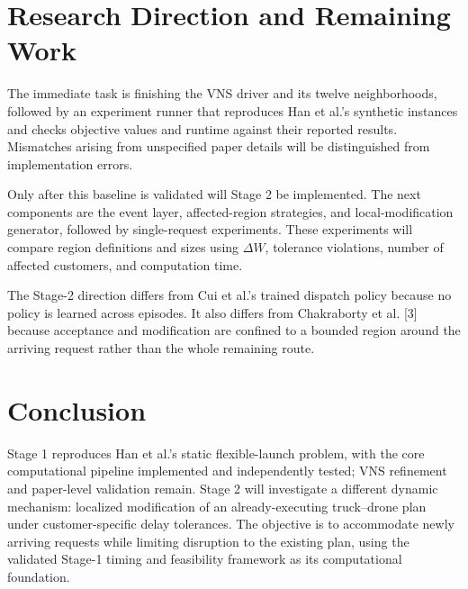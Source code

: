 \documentclass[10pt,a4paper]{article}
\begin{document}
\section{Research Direction and Remaining Work}

The immediate task is finishing the VNS driver and its twelve
neighborhoods, followed by an experiment runner that reproduces Han
et al.'s synthetic instances and checks objective values and runtime
against their reported results. Mismatches arising from unspecified
paper details will be distinguished from implementation errors.

Only after this baseline is validated will Stage 2 be implemented. The
next components are the event layer, affected-region strategies, and
local-modification generator, followed by single-request experiments.
These experiments will compare region definitions and sizes using
$\Delta W$, tolerance violations, number of affected customers, and
computation time.

The Stage-2 direction differs from Cui et al.'s trained dispatch policy
because no policy is learned across episodes. It also differs from
Chakraborty et al. [3] because acceptance and modification are confined
to a bounded region around the arriving request rather than the whole
remaining route.

\section{Conclusion}

Stage 1 reproduces Han et al.'s static flexible-launch problem, with
the core computational pipeline implemented and independently tested;
VNS refinement and paper-level validation remain. Stage 2 will
investigate a different dynamic mechanism: localized modification of
an already-executing truck--drone plan under customer-specific delay
tolerances. The objective is to accommodate newly arriving requests
while limiting disruption to the existing plan, using the validated
Stage-1 timing and feasibility framework as its computational
foundation.


\balance
\end{document}
